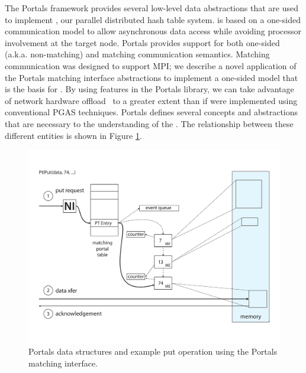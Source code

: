 





The Portals framework provides several low-level data abstractions that
are used to implement \pdht, our parallel distributed hash table system. \pdht is based on a one-sided
communication model to allow asynchronous data access while avoiding processor
involvement at the target node.  Portals provides support for both
one-sided (a.k.a. non-matching) and matching communication semantics.
Matching communication was designed to support MPI; we describe
a novel application of the Portals matching interface
abstractions to implement a one-sided model that is the basis for
\pdht. By using features in the Portals library,
we can take advantage of network hardware offload~\cite{brightwell:micro:06,bxi} to a greater extent
than if \pdht were implemented using conventional PGAS techniques. Portals defines several concepts
and abstractions that are necessary to the understanding of the
\pdht. The relationship between these different entities is shown in
Figure \ref{fig:portals_put}.

\begin{figure}[ht]
  \centering
  \includegraphics[width=\linewidth]{figs/portals_put}
  \caption{Portals data structures and example put operation using the Portals matching interface.}
  \label{fig:portals_put}
\end{figure}

